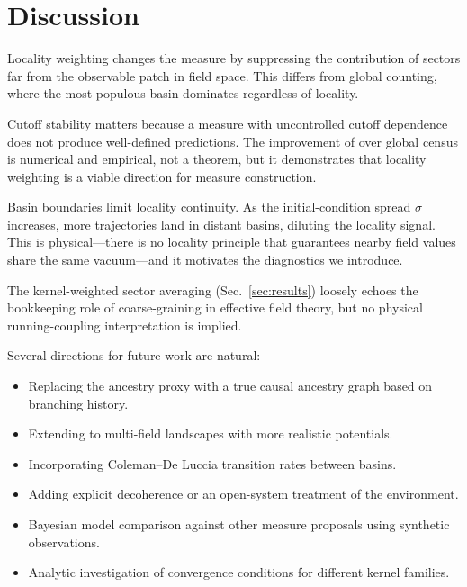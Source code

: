 \section{Discussion}
\label{sec:discussion}

Locality weighting changes the measure by suppressing the contribution of
sectors far from the observable patch in field space.
This differs from global counting, where the most populous basin dominates
regardless of locality.

Cutoff stability matters because a measure with uncontrolled cutoff dependence
does not produce well-defined predictions.
The improvement of \ISR over global census is numerical and empirical, not a
theorem, but it demonstrates that locality weighting is a viable direction
for measure construction.

Basin boundaries limit locality continuity.
As the initial-condition spread $\sigma$ increases, more trajectories land in
distant basins, diluting the locality signal.
This is physical---there is no locality principle that guarantees nearby
field values share the same vacuum---and it motivates the diagnostics we
introduce.

The kernel-weighted sector averaging (Sec.~\ref{sec:results}) loosely echoes
the bookkeeping role of coarse-graining in effective field theory, but no
physical running-coupling interpretation is implied.

Several directions for future work are natural:
\begin{itemize}
  \item Replacing the ancestry proxy with a true causal ancestry graph
        based on branching history.
  \item Extending to multi-field landscapes with more realistic potentials.
  \item Incorporating Coleman--De Luccia transition rates between basins.
  \item Adding explicit decoherence or an open-system treatment of the
        environment.
  \item Bayesian model comparison against other measure proposals using
        synthetic observations.
  \item Analytic investigation of convergence conditions for different
        kernel families.
\end{itemize}
